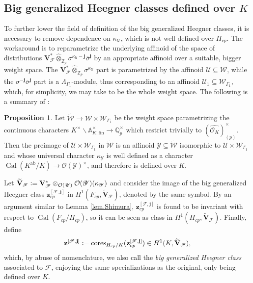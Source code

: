 \documentclass[a4paper]{amsart}
\numberwithin{equation}{section}
\theoremstyle{definition}
\newtheorem{proposition}[theorem]{Proposition}
\newcommand{\Z}{\mathbb{Z}}
\newcommand{\defeq}{\vcentcolon=}
\DeclareMathOperator{\Gal}{Gal}
\newcommand{\cores}{\mathrm{cores}}
\begin{document}
\subsection{Big generalized Heegner classes defined over $K$}
To further lower the field of definition of the big generalized Heegner classes, it is necessary to remove dependence on $\kappa_{{\mathscr{U}}}$, which is not well-defined over $H_{cp}$. The workaround is to reparametrize the underlying affinoid of the space of distributions $\mathbf{V}_\mathscr{F}^*\widehat{\otimes}_{\Z_p}\sigma^{\kappa_{{\mathscr{U}}}-\mathbf{j}}\bar{\sigma}^{\mathbf{j}}$ by an appropriate affinoid over a suitable, bigger weight space. The $\mathbf{V}_\mathscr{F}^*\widehat{\otimes}_{\Z_p}\sigma^{\kappa_\mathscr{U}}$ part is parametrized by the affinoid $\mathscr{U}\subseteq\mathscr{W}$, while the $\sigma^{-\mathbf{j}}\bar{\sigma}^{\mathbf{j}}$ part is a $\Lambda_{\Gamma_1}$-module, thus corresponding to an affinoid $\mathscr{U}_1\subseteq\mathscr{W}_{\Gamma_1}$, which, for simplicity, we may take to be the whole weight space. The following is a summary of \cite[\S5.4]{JetchevLoefflerZerbes}:

\begin{proposition}
Let $\widetilde{\mathscr{W}}\to\mathscr{W}\times\mathscr{W}_{\Gamma_1}$ be the weight space parametrizing the continuous characters $K^\times\backslash\mathbb{A}_{K,\mathrm{fin}}^\times\to\mathbb{Q}_p^\times$ which restrict trivially to $(\widehat{\mathcal{O}_K})_{(p)}^\times$. Then the preimage of $\mathscr{U}\times\mathscr{W}_{\Gamma_1}$ in $\widetilde{\mathscr{W}}$ is an affinoid $\mathscr{Y}\subseteq \widetilde{\mathscr{W}}$ isomorphic to $\mathscr{U}\times\mathscr{W}_{\Gamma_1}$ and whose universal character $\kappa_{\mathscr{Y}}$ is well defined as a character $\Gal(K^\mathrm{ab}/K)\to\mathcal{O}(\mathscr{Y})^\times$, and therefore is defined over $K$.
\end{proposition}

Let $\widetilde{\mathbf{V}}_\mathscr{F}\defeq\mathbf{V}_{\mathscr{F}}^*\otimes_{\mathcal{O}(\mathscr{U})}\mathcal{O}(\mathscr{Y})(\kappa_{\mathscr{Y}})$ and consider the image of the big generalized Heegner class $\mathbf{z}^{[\mathscr{F},\mathbf{j}]}_{cp}$ in $H^1(F_{cp},\widetilde{\mathbf{V}}_\mathscr{F})$, denoted by the same symbol. By an argument similar to Lemma \ref{lem.Shimura}, $\mathbf{z}^{[\mathscr{F},\mathbf{j}]}_{cp}$ is found to be invariant with respect to $\Gal(F_{cp}/H_{cp})$, so it can be seen as class in $H^1(H_{cp},\widetilde{\mathbf{V}}_\mathscr{F})$. Finally, define \[\mathbf{z}^{[\mathscr{F},\mathbf{j}]}\defeq\cores_{H_{cp}/K}(\mathbf{z}^{[\mathscr{F},\mathbf{j}]}_{cp})\in H^1(K,\widetilde{\mathbf{V}}_\mathscr{F}),\] which, by abuse of nomenclature, we also call the \textit{big generalized Heegner class} associated to $\mathscr{F}$, enjoying the same specializations as the original, only being defined over $K$.



\end{document}
